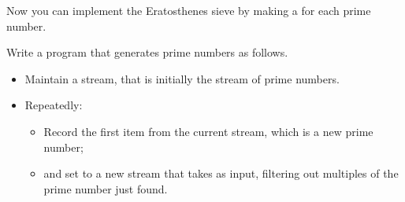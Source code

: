 Now you can implement the Eratosthenes sieve by making a
 for each prime number.

\begin{exercise}
  Write a program that generates prime numbers as follows.
  \begin{itemize}
  \item Maintain a  stream, that is initially the stream of
    prime numbers.
  \item Repeatedly:
    \begin{itemize}
    \item Record the first item from the current stream, which is a
      new prime number;
    \item and set  to a new stream that takes 
      as input, filtering out multiples of the prime number just found.
    \end{itemize}
  \end{itemize}
\end{exercise}
